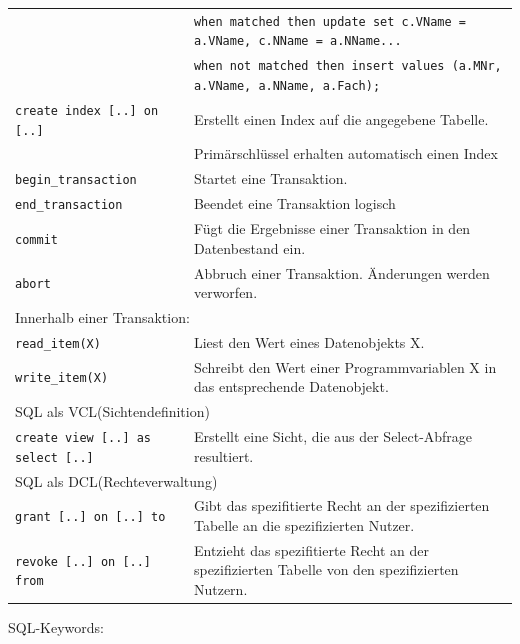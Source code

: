 \documentclass{article}
\begin{document}
\begin{center}
\begin{longtable}{|p{4cm}|p{7cm}|}
    & \texttt{when matched then update set c.VName = a.VName, c.NName = a.NName...} \\
    & \texttt{when not matched then insert values (a.MNr, a.VName, a.NName, a.Fach);} \\
    \hline
    \texttt{create index [..] on [..]} & Erstellt einen Index auf die angegebene Tabelle. \\
    & Primärschlüssel erhalten automatisch einen Index \\
    \hline
    \texttt{begin\_transaction} & Startet eine Transaktion. \\
    \hline
    \texttt{end\_transaction} & Beendet eine Transaktion logisch \\
    \hline
    \texttt{commit} & Fügt die Ergebnisse einer Transaktion in den Datenbestand ein. \\
    \hline
    \texttt{abort} & Abbruch einer Transaktion. Änderungen werden verworfen. \\
    \hline
    \multicolumn{2}{|p{11cm}|}{Innerhalb einer Transaktion:} \\
    \hline
    \texttt{read\_item(X)} & Liest den Wert eines Datenobjekts X. \\
    \hline
    \texttt{write\_item(X)} & Schreibt den Wert einer Programmvariablen X in das entsprechende Datenobjekt. \\
    \hline
    \multicolumn{2}{|p{11cm}|}{SQL als VCL(Sichtendefinition)} \\
    \hline
    \texttt{create view [..] as select [..]} & Erstellt eine Sicht, die aus der Select-Abfrage resultiert. \\
    \hline
    \multicolumn{2}{|p{11cm}|}{SQL als DCL(Rechteverwaltung)} \\
    \hline
    \texttt{grant [..] on [..] to} &  Gibt das spezifitierte Recht an der spezifizierten Tabelle an die spezifizierten Nutzer.\\
    \hline
    \texttt{revoke [..] on [..] from} & Entzieht das spezifitierte Recht an der spezifizierten Tabelle von den spezifizierten Nutzern. \\
    \hline
  \end{longtable}
\end{center}
SQL-Keywords:
\end{document}
